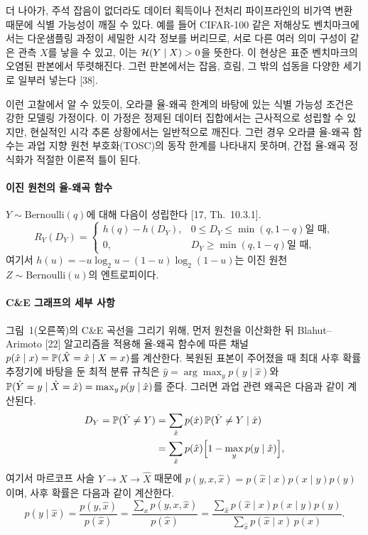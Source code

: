 더 나아가, 주석 잡음이 없더라도 데이터 획득이나 전처리 파이프라인의 비가역 변환 때문에 식별 가능성이 깨질 수 있다. 예를 들어 CIFAR-100 같은 저해상도 벤치마크에서는 다운샘플링 과정이 세밀한 시각 정보를 버리므로,
서로 다른 여러 의미 구성이 같은 관측 $X$를 낳을 수 있고, 이는 $\Hh(Y\mid X)>0$을 뜻한다. 이 현상은 표준 벤치마크의 오염된 판본에서 뚜렷해진다. 그런 판본에서는 잡음, 흐림, 그 밖의 섭동을 다양한 세기로 일부러 넣는다 [38].

이런 고찰에서 알 수 있듯이, 오라클 율-왜곡 한계의 바탕에 있는 식별 가능성 조건은 강한 모델링 가정이다. 이 가정은 정제된 데이터 집합에서는 근사적으로 성립할 수 있지만, 현실적인 시각 추론 상황에서는 일반적으로 깨진다. 그런 경우 오라클 율-왜곡 함수는 과업 지향 원천 부호화(TOSC)의 동작 한계를 나타내지 못하며, 간접 율-왜곡 정식화가 적절한 이론적 틀이 된다.

\paragraph{이진 원천의 율-왜곡 함수}
$Y\sim\mathrm{Bernoulli}(q)$에 대해 다음이 성립한다 [17, Th.~10.3.1].
\begin{equation*}
R_Y(D_Y)=\begin{cases}h(q)-h(D_Y), & 0\le D_Y\le\min(q,1-q)\text{일 때},\\ 0, & D_Y\ge\min(q,1-q)\text{일 때},\end{cases}
\end{equation*}
여기서 $h(u)=-u\log_2u-(1-u)\log_2(1-u)$는 이진 원천 $Z\sim\mathrm{Bernoulli}(u)$의 엔트로피이다.

\paragraph{C\&E 그래프의 세부 사항}
그림~1(오른쪽)의 C\&E 곡선을 그리기 위해, 먼저 원천을 이산화한 뒤 Blahut--Arimoto [22] 알고리즘을 적용해 율-왜곡 함수에 따른 채널 $p(\hat x\mid x)=\P(\hat X=\hat x\mid X=x)$를 계산한다. 복원된 표본이 주어졌을 때 최대 사후 확률 추정기에 바탕을 둔 최적 분류 규칙은 $\hat y=\arg\max_y p(y\mid\hat x)$와 $\P(\Yh=y\mid\hat X=\hat x)=\max_y p(y\mid\hat x)$를 준다. 그러면 과업 관련 왜곡은 다음과 같이 계산된다.
\begin{align*}
D_Y=\P(\Yh\ne Y)&=\sum_{\hat x}p(\hat x)\,\P(\Yh\ne Y\mid\hat x)\\
&=\sum_{\hat x}p(\hat x)\Bigl[1-\max_y p(y\mid\hat x)\Bigr],
\end{align*}
여기서 마르코프 사슬 $Y\to X\to\hat X$ 때문에 $p(y,x,\hat x)=p(\hat x\mid x)p(x\mid y)p(y)$이며, 사후 확률은 다음과 같이 계산한다.
\begin{equation*}
p(y\mid\hat x)=\frac{p(y,\hat x)}{p(\hat x)}=\frac{\sum_x p(y,x,\hat x)}{p(\hat x)}=\frac{\sum_{\hat x}p(\hat x\mid x)p(x\mid y)p(y)}{\sum_{\hat x}p(\hat x\mid x)\,p(x)}.
\end{equation*}

